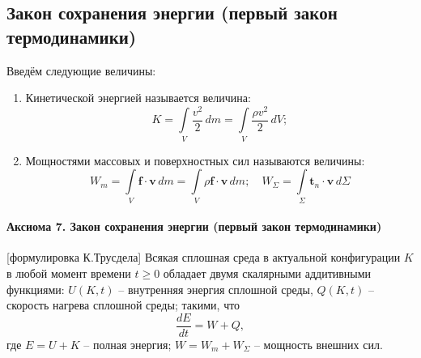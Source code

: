 

\subsection{Закон сохранения энергии (первый закон термодинамики)}

\begin{definition}
  Введём следующие величины:
  \begin{enumerate}
    \item Кинетической энергией называется величина:
      \[
        K = \int\limits_V \dfrac{v^2}{2} \, dm = \int\limits_V \dfrac{\rho v^2}{2} \, dV;
      \]
    \item Мощностями массовых и поверхностных сил называются величины:
      \[
        W_m = \int\limits_V \mathbf{f} \cdot \mathbf{v} \, dm
        = \int\limits_V \rho \mathbf{f} \cdot \mathbf{v} \, dm; \quad
        W_\Sigma = \int\limits_\Sigma \mathbf{t}_n \cdot \mathbf{v} \, d\Sigma
      \]
  \end{enumerate}
\end{definition}

\paragraph{Аксиома 7. Закон сохранения энергии (первый закон термодинамики)}[формулировка К.Трусдела]
Всякая сплошная среда в актуальной конфигурации $K$ в любой момент времени $t \geqslant 0$
обладает двумя скалярными аддитивными функциями:
$U(K, t)$ -- внутренняя энергия сплошной среды, $Q(K, t)$ -- скорость нагрева сплошной среды;
такими, что
\[
  \dfrac{dE}{dt} = W + Q,
\]
где $E = U + K$ -- полная энергия;
$W = W_m + W_\Sigma$ -- мощность внешних сил.
